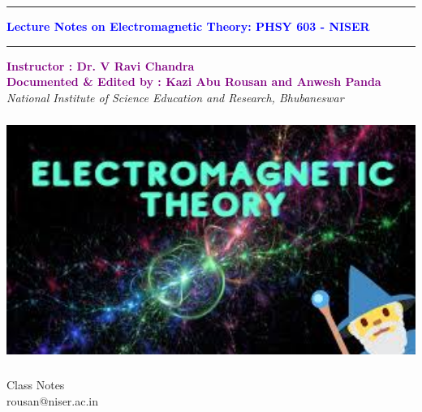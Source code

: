 \documentclass{article}
\begin{document}
\begin{titlepage}
    \begin{center}
    \vspace{0.4cm}
    \hrule
    \Huge
    \vspace{0.8cm}
        \textcolor{blue}{\textbf{Lecture Notes on Electromagnetic Theory: PHSY 603 - NISER}}
        \vspace{0.8cm}
        \hrule
        \vspace{1cm}
        \Large
        \textcolor{purple}{\textbf{Instructor : Dr. V Ravi Chandra  \\ Documented \& Edited by : Kazi Abu Rousan and Anwesh Panda}}\\
        \vspace{0.5cm}
        \large
        \emph{National Institute of Science Education and Research, Bhubaneswar}\\
        \vspace{0.8cm}
        
        \begin{center}
		\vspace{0.2cm}
		\includegraphics[height=8cm]{Images/logo.jpeg}\\
		\end{center}
        \vspace{0.5cm}
        \vspace{0.4cm}
        \Large
        Class Notes\\
        \vspace{0.7cm}
        rousan@niser.ac.in\\
      
        \vspace{1.3cm}
        
        
        
    \end{center}
\end{titlepage}
\newpage
\end{document}
